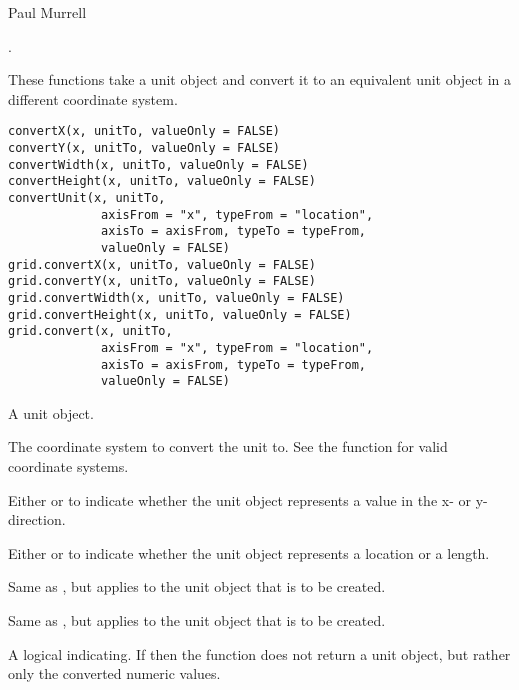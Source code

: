 %
\begin{Author}\relax
Paul Murrell
\end{Author}
%
\begin{SeeAlso}\relax
{}.
\end{SeeAlso}
%
\begin{Description}\relax
These functions take a unit object and convert it to an
equivalent
unit object in a different coordinate system.
\end{Description}
%
\begin{Usage}
\begin{verbatim}
convertX(x, unitTo, valueOnly = FALSE) 
convertY(x, unitTo, valueOnly = FALSE) 
convertWidth(x, unitTo, valueOnly = FALSE) 
convertHeight(x, unitTo, valueOnly = FALSE) 
convertUnit(x, unitTo,
             axisFrom = "x", typeFrom = "location",
             axisTo = axisFrom, typeTo = typeFrom,
             valueOnly = FALSE)
grid.convertX(x, unitTo, valueOnly = FALSE) 
grid.convertY(x, unitTo, valueOnly = FALSE) 
grid.convertWidth(x, unitTo, valueOnly = FALSE) 
grid.convertHeight(x, unitTo, valueOnly = FALSE) 
grid.convert(x, unitTo,
             axisFrom = "x", typeFrom = "location",
             axisTo = axisFrom, typeTo = typeFrom,
             valueOnly = FALSE)
\end{verbatim}
\end{Usage}
%
\begin{Arguments}
\begin{ldescription}
\item[\code{x}]  A unit object. 
\item[\code{unitTo}]  The coordinate system to convert the unit to.
See the  function for valid coordinate systems.
\item[\code{axisFrom}]  Either  or  to indicate
whether the unit object represents a value in the x- or
y-direction. 
\item[\code{typeFrom}]  Either  or 
to indicate whether the unit object represents a location or a
length. 
\item[\code{axisTo}]  Same as , but applies to the unit object
that is to be created. 
\item[\code{typeTo}]  Same as , but applies to the unit object
that is to be created. 
\item[\code{valueOnly}]  A logical indicating.  If  then
the function does not return a unit object, but rather only the
converted numeric values. 
\end{ldescription}
\end{Arguments}
